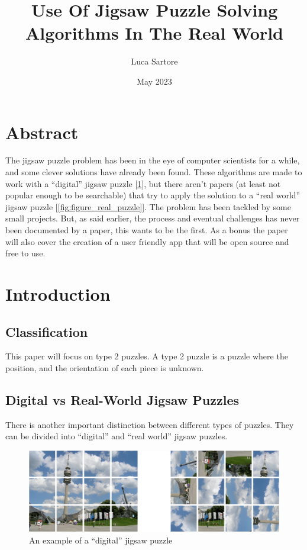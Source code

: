\documentclass{article}
\title{Use Of Jigsaw Puzzle Solving Algorithms In The Real World}
\author{Luca Sartore}
\date{May 2023}
\begin{document}
\maketitle

\newpage

{
  \hypersetup{linkcolor=black}
  \tableofcontents
}

\newpage

\section{Abstract}
The jigsaw puzzle problem has been in the eye of computer scientists for a while,
and some clever solutions have already been found. These algorithms are made to
work with a “digital” jigsaw puzzle [\ref{fig:figure_digital_puzzle}],
but there aren't papers (at least not popular enough to be searchable)
that try to apply the solution
to a “real world” jigsaw puzzle [\ref{fig:figure_real_puzzle}].\newline
The problem has been tackled by some small projects. But, as said earlier,
the process and eventual challenges has never been documented by a paper,
this wants to be the first.\newline
As a bonus the paper will also cover the creation of a user friendly app
that will be open source and free to use.

\section{Introduction}
\subsection{Classification}
This paper will focus on type 2 puzzles. A type 2 puzzle is a puzzle where the position, and the orientation of each piece is unknown. 
\subsection{Digital vs Real-World Jigsaw Puzzles}

There is  another important distinction between different types of puzzles. They can be divided into “digital” and “real world” jigsaw puzzles.


\begin{figure}[h]
    \caption{An example of a “digital” jigsaw  puzzle}\label{fig:figure_digital_puzzle}
    \centering
    \includegraphics[height=0.25\textwidth]{pictures/digital_puzzle.png}
\end{figure}
\end{document}
